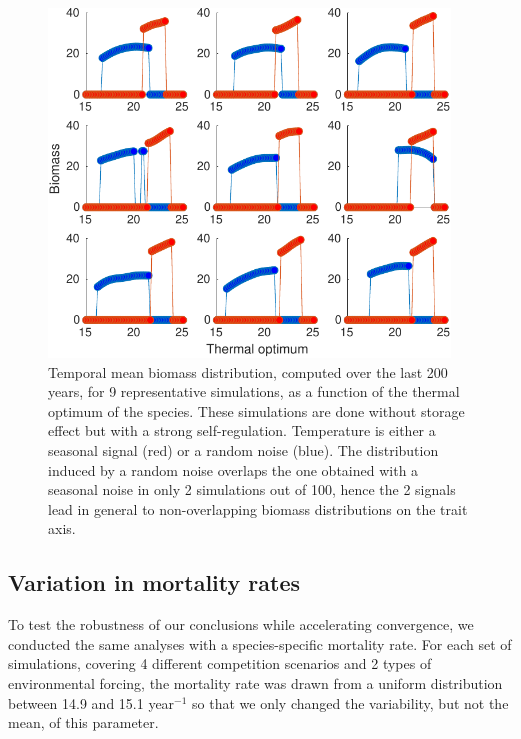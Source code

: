 \documentclass[a4paper,12pt]{article}
\begin{document}
\begin{figure}[!ht]
\begin{centering}
\includegraphics[width=0.95\textwidth]{example_iteration-eps-converted-to.pdf}
\par\end{centering}
\caption{Temporal mean biomass distribution, computed over the last 200 years,
for 9 representative simulations, as a function of the thermal optimum
of the species. These simulations are done without storage effect
but with a strong self-regulation. Temperature is either a seasonal
signal (red) or a random noise (blue). The distribution induced
by a random noise overlaps the one obtained with a seasonal noise in only 2 simulations out of 100, hence the 2 signals
lead in general to non-overlapping biomass distributions on the
trait axis. \label{fig:Not_representative_behaviour} }
\end{figure}

\newpage
\subsection*{Variation in mortality rates}

To test the robustness of our conclusions while accelerating convergence, we conducted the same analyses with a species-specific mortality rate. For each set of simulations, covering 4 different competition scenarios and 2 types of environmental forcing, the mortality rate was drawn from a uniform distribution between 14.9 and 15.1 year$^{-1}$ so that we only changed the variability, but not the mean, of this parameter. 
\end{document}

